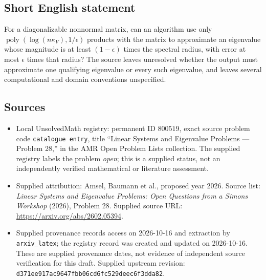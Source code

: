 \documentclass[11pt]{article}
\begin{document}
\subsection{Short English statement}
For a diagonalizable nonnormal matrix, can an algorithm use only \(\operatorname{poly}(\log(n\kappa_V),1/\epsilon)\) products with the matrix to approximate an eigenvalue whose magnitude is at least \((1-\epsilon)\) times the spectral radius, with error at most \(\epsilon\) times that radius? The source leaves unresolved whether the output must approximate one qualifying eigenvalue or every such eigenvalue, and leaves several computational and domain conventions unspecified.
\subsection{Sources}
\begin{itemize}
\item Local UnsolvedMath registry: permanent ID \(800519\), exact source problem code \texttt{catalogue entry}, title ``Linear Systems and Eigenvalue Problems --- Problem 28,'' in the AMR Open Problem Lists collection. The supplied registry labels the problem \emph{open}; this is a supplied status, not an independently verified mathematical or literature assessment.
\item Supplied attribution: Amsel, Baumann et al., proposed year 2026. Source list: \emph{Linear Systems and Eigenvalue Problems: Open Questions from a Simons Workshop} (2026), Problem 28. Supplied source URL: \url{https://arxiv.org/abs/2602.05394}.
\item Supplied provenance records access on 2026-10-16 and extraction by \texttt{arxiv\_latex}; the registry record was created and updated on 2026-10-16. These are supplied provenance dates, not evidence of independent source verification for this draft. Supplied upstream revision: \texttt{d371ee917ac9647fbb06cd6fc529deec6f3dda82}.
\end{itemize}
\end{document}
